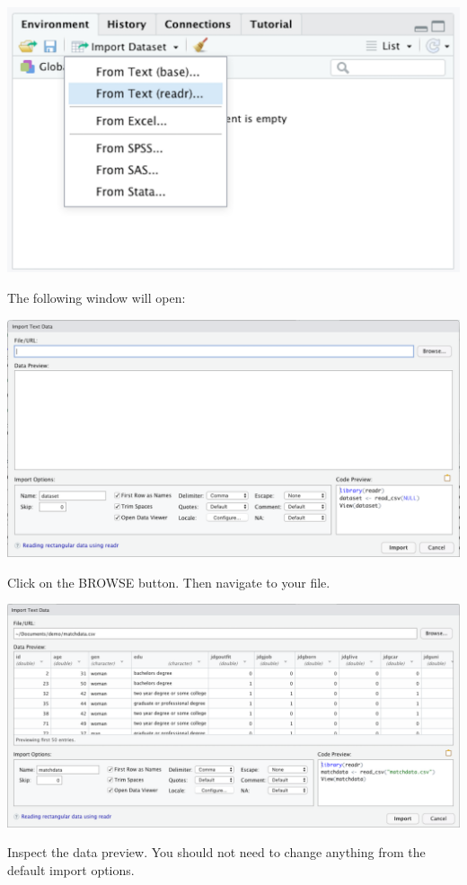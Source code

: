 \documentclass[
]{book}
\begin{document}
\includegraphics{img/DATA THINGS 1R6.png}

The following window will open:

\includegraphics{img/DATA THINGS 1R7.png}

Click on the BROWSE button. Then navigate to your file.

\includegraphics{img/DATA THINGS 1R8.png}

Inspect the data preview. You should not need to change anything from the default import options.
\end{document}
